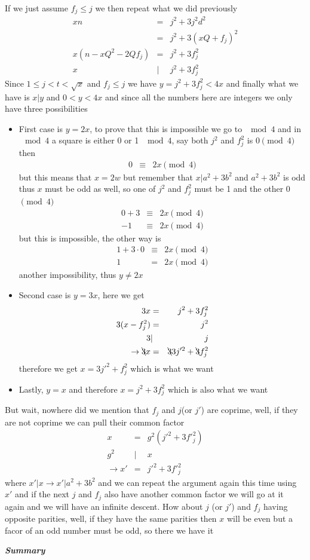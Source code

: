 \documentclass[aps,preprint,preprintnumbers,nofootinbib,showpacs,prd]{revtex4-1}
\newcommand{\bit}{\begin{itemize}}
\newcommand{\eit}{\end{itemize}}
\newcommand{\nbea}{\begin{eqnarray*}}
\newcommand{\neea}{\end{eqnarray*}}
\begin{document}
If we just assume $f_j \le j$ we then repeat what we did previously
%
\nbea
xn & = & j^2 + 3 j^2d^2 \\
& = & j^2 + 3 (xQ + f_j)^2 \\
x(n - xQ^2 - 2Qf_j) & = & j^2 + 3f_j^2 \\
x &|& j^2 + 3f_j^2
\neea
%
Since $1 \le j < t < \sqrt{x}$ and $f_j \le j$ we have $y = j^2 + 3f_j^2 < 4x$ and finally what we have is $x|y$ and $0 <y< 4x$ and since all the numbers here are integers we only have three possibilities
%
\bit
\item First case is $y = 2x$, to prove that this is impossible we go to $\mod 4$ and in $\mod 4$ a square is either 0 or 1 $\mod 4$, say both $j^2$ and $f_j^2$ is $0 \pmod{4}$ then
%
\nbea
0 & \equiv & 2x \pmod{4}
\neea
%
but this means that $x = 2w$ but remember that $x|a^2 + 3b^2$ and $a^2 + 3b^2$ is odd thus $x$ must be odd as well, so one of $j^2$ and $f_j^2$ must be 1 and the other 0$\pmod{4}$
%
\nbea
0 + 3 & \equiv & 2x \pmod{4} \\
-1 & \equiv & 2x \pmod{4}
\neea
%
but this is impossible, the other way is
%
\nbea
1 + 3\cdot 0 & \equiv & 2x \pmod{4} \\
1 & = & 2x \pmod{4}
\neea
%
another impossibility, thus $y\neq 2x$
\item Second case is $y = 3x$, here we get
%
\nbea
3x & = & j^2 + 3f_j^2 \\
3(x - f_j^2) & = & j^2 \\
3 &|& j \\
\to \bcancel{3}x & = & \bcancel{3}3j'^2 + \bcancel{3}f_j^2
\neea
%
therefore we get $x = 3j'^2 + f_j^2$ which is what we want
\item Lastly, $y=x$ and therefore $x = j^2 + 3f_j^2$ which is also what we want
\eit
%

But wait, nowhere did we mention that $f_j$ and $j$(or $j'$) are coprime, well, if they are not coprime we can pull their common factor
%
\nbea
x & = & g^2(j'^2 + 3{f'}_j^2) \\
g^2 &|& x \\
\to x' & = & j'^2 + 3{f'}_j^2
\neea
%
where $x'|x \to x'|a^2 + 3b^2$ and we can repeat the argument again this time using $x'$ and if the next $j$ and $f_j$ also have another common factor we will go at it again and we will have an infinite descent. How about $j$ (or $j'$) and $f_j$ having opposite parities, well, if they have the same parities then $x$ will be even but a facor of an odd number must be odd, so there we have it

\bigskip
\textit{\textbf{Summary}}
\smallskip
\end{document}
